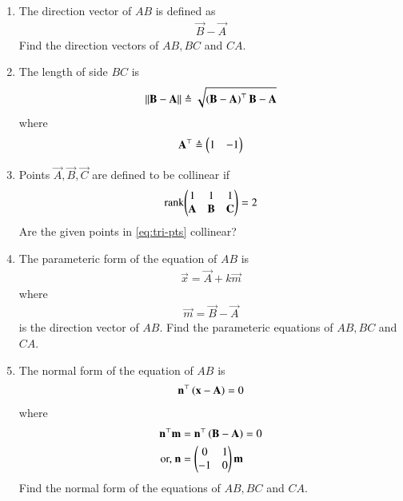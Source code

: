 \begin{enumerate}[label=\thesection.\arabic*.,ref=\thesection.\theenumi]
\item The direction vector of $AB$ is defined as
		\begin{align}
			\vec{B}-
			\vec{A}
		\end{align}
Find the direction vectors of $AB, BC$ and $CA$.
\\
	
	\item The length of side $BC$ is 
		\begin{align}
			\left\lVert\mathbf{B}-\mathbf{A}\right\rVert \triangleq \sqrt{\left(\mathbf{B}-\mathbf{A}\right)^{\top}{\mathbf{B}-\mathbf{A}}}
		\end{align}
		where
		\begin{align}
			\mathbf{A}^{\top}\triangleq\begin{pmatrix}1 & -1\end{pmatrix}
		\end{align}
\item   Points $\vec{A}, \vec{B}, \vec{C}$ are defined to be collinear if 
		\begin{align}
			\text{rank}{\ensuremath{\begin{pmatrix}1 & 1 & 1 \\ \mathbf{A}& \mathbf{B}&\mathbf{C}\end{pmatrix}}} = 2
		\end{align}
Are the given points in
			\eqref{eq:tri-pts}
collinear?
\item The parameteric form of the equation  of $AB$ is 
		\begin{align}
			\vec{x}=\vec{A}+k\vec{m}
		\end{align}
		where
		\begin{align}
\vec{m}=\vec{B}-\vec{A}
		\end{align}
is the direction vector of $AB$.
Find the parameteric equations of $AB, BC$ and $CA$.
\\
		
\item The normal form of the equation of $AB$  is 
		\begin{align}
			\mathbf{n}^{\top}\left(	\mathbf{x}-\mathbf{A}\right) = 0
		\end{align}
		where 
		\begin{align}
			\mathbf{n}^{\top}\mathbf{m}&=\mathbf{n}^{\top}\left(\mathbf{B}-\mathbf{A}\right) = 0
			\\
			\text{or, } \mathbf{n}&=\begin{pmatrix}0 & 1 \\ -1 & 0\end{pmatrix} \mathbf{m}
		\end{align}
Find the normal form of the equations of $AB, BC$ and $CA$.

\end{enumerate}
